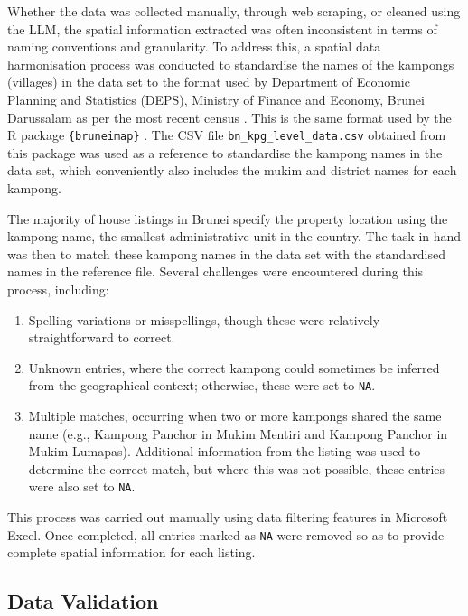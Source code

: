 \documentclass[
  number]{elsarticle}
\providecommand{\tightlist}{%
  \setlength{\itemsep}{0pt}\setlength{\parskip}{0pt}}\usepackage{longtable,booktabs,array}
\begin{document}
Whether the data was collected manually, through web scraping, or
cleaned using the LLM, the spatial information extracted was often
inconsistent in terms of naming conventions and granularity. To address
this, a spatial data harmonisation process was conducted to standardise
the names of the kampongs (villages) in the data set to the format used
by Department of Economic Planning and Statistics (DEPS), Ministry of
Finance and Economy, Brunei Darussalam as per the most recent census
\citep{deps2022population}. This is the same format used by the R
package \texttt{\{bruneimap\}} \citep{jamil2024bruneimap}. The CSV file
\texttt{bn\_kpg\_level\_data.csv} obtained from this package was used as
a reference to standardise the kampong names in the data set, which
conveniently also includes the mukim and district names for each
kampong.

The majority of house listings in Brunei specify the property location
using the kampong name, the smallest administrative unit in the country.
The task in hand was then to match these kampong names in the data set
with the standardised names in the reference file. Several challenges
were encountered during this process, including:

\begin{enumerate}
\def\labelenumi{\arabic{enumi}.}
\tightlist
\item
  Spelling variations or misspellings, though these were relatively
  straightforward to correct.
\item
  Unknown entries, where the correct kampong could sometimes be inferred
  from the geographical context; otherwise, these were set to
  \texttt{NA}.
\item
  Multiple matches, occurring when two or more kampongs shared the same
  name (e.g., Kampong Panchor in Mukim Mentiri and Kampong Panchor in
  Mukim Lumapas). Additional information from the listing was used to
  determine the correct match, but where this was not possible, these
  entries were also set to \texttt{NA}.
\end{enumerate}

This process was carried out manually using data filtering features in
Microsoft Excel. Once completed, all entries marked as \texttt{NA} were
removed so as to provide complete spatial information for each listing.

\subsection{Data Validation}\label{sec-data-validation}
\end{document}
